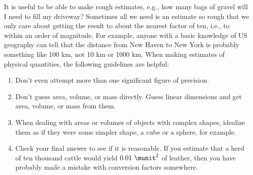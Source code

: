 It is useful to be able to make rough estimates, e.g., how many bags of
gravel will I need to fill my driveway? Sometimes all we need is an estimate
so rough that we only care about getting the result to about the nearest factor
of ten, i.e., to within an order of magnitude. For example, anyone with a basic
knowledge of US geography can tell that the distance from New Haven to New York
is probably something like 100 km, not 10 km or 1000 km. When making estimates
of physical quantities, the following guidelines are helpful:

\begin{enumerate}
\item Don't even attempt more than one significant figure of precision.

\item Don't guess area, volume, or mass directly. Guess linear
dimensions and get area, volume, or mass from them.

\item When dealing with areas or volumes of objects with
complex shapes, idealize them as if they were some simpler
shape, a cube or a sphere, for example.

\item Check your final answer to see if it is reasonable. If
you estimate that a herd of ten thousand cattle would yield
$0.01\ \munit^2$ of leather, then you have probably made a mistake
with conversion factors somewhere.
\end{enumerate}
